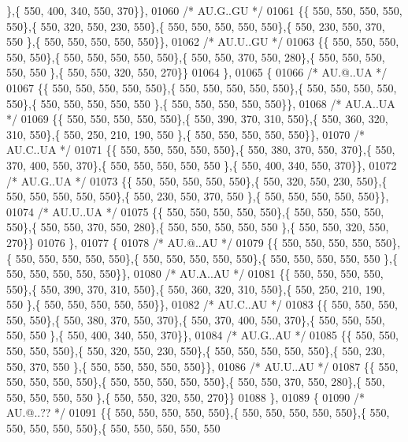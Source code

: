\begin{DoxyCode}
      \},\{ 550, 400, 340, 550, 370\}\},
01060 \textcolor{comment}{/* AU.G..GU */}
01061 \{\{ 550, 550, 550, 550, 550\},\{ 550, 320, 550, 230, 550\},\{ 550, 550, 550, 550, 550\},\{ 550, 230, 550, 370, 550
      \},\{ 550, 550, 550, 550, 550\}\},
01062 \textcolor{comment}{/* AU.U..GU */}
01063 \{\{ 550, 550, 550, 550, 550\},\{ 550, 550, 550, 550, 550\},\{ 550, 550, 370, 550, 280\},\{ 550, 550, 550, 550, 550
      \},\{ 550, 550, 320, 550, 270\}\}
01064 \},
01065 \{
01066 \textcolor{comment}{/* AU.@..UA */}
01067 \{\{ 550, 550, 550, 550, 550\},\{ 550, 550, 550, 550, 550\},\{ 550, 550, 550, 550, 550\},\{ 550, 550, 550, 550, 550
      \},\{ 550, 550, 550, 550, 550\}\},
01068 \textcolor{comment}{/* AU.A..UA */}
01069 \{\{ 550, 550, 550, 550, 550\},\{ 550, 390, 370, 310, 550\},\{ 550, 360, 320, 310, 550\},\{ 550, 250, 210, 190, 550
      \},\{ 550, 550, 550, 550, 550\}\},
01070 \textcolor{comment}{/* AU.C..UA */}
01071 \{\{ 550, 550, 550, 550, 550\},\{ 550, 380, 370, 550, 370\},\{ 550, 370, 400, 550, 370\},\{ 550, 550, 550, 550, 550
      \},\{ 550, 400, 340, 550, 370\}\},
01072 \textcolor{comment}{/* AU.G..UA */}
01073 \{\{ 550, 550, 550, 550, 550\},\{ 550, 320, 550, 230, 550\},\{ 550, 550, 550, 550, 550\},\{ 550, 230, 550, 370, 550
      \},\{ 550, 550, 550, 550, 550\}\},
01074 \textcolor{comment}{/* AU.U..UA */}
01075 \{\{ 550, 550, 550, 550, 550\},\{ 550, 550, 550, 550, 550\},\{ 550, 550, 370, 550, 280\},\{ 550, 550, 550, 550, 550
      \},\{ 550, 550, 320, 550, 270\}\}
01076 \},
01077 \{
01078 \textcolor{comment}{/* AU.@..AU */}
01079 \{\{ 550, 550, 550, 550, 550\},\{ 550, 550, 550, 550, 550\},\{ 550, 550, 550, 550, 550\},\{ 550, 550, 550, 550, 550
      \},\{ 550, 550, 550, 550, 550\}\},
01080 \textcolor{comment}{/* AU.A..AU */}
01081 \{\{ 550, 550, 550, 550, 550\},\{ 550, 390, 370, 310, 550\},\{ 550, 360, 320, 310, 550\},\{ 550, 250, 210, 190, 550
      \},\{ 550, 550, 550, 550, 550\}\},
01082 \textcolor{comment}{/* AU.C..AU */}
01083 \{\{ 550, 550, 550, 550, 550\},\{ 550, 380, 370, 550, 370\},\{ 550, 370, 400, 550, 370\},\{ 550, 550, 550, 550, 550
      \},\{ 550, 400, 340, 550, 370\}\},
01084 \textcolor{comment}{/* AU.G..AU */}
01085 \{\{ 550, 550, 550, 550, 550\},\{ 550, 320, 550, 230, 550\},\{ 550, 550, 550, 550, 550\},\{ 550, 230, 550, 370, 550
      \},\{ 550, 550, 550, 550, 550\}\},
01086 \textcolor{comment}{/* AU.U..AU */}
01087 \{\{ 550, 550, 550, 550, 550\},\{ 550, 550, 550, 550, 550\},\{ 550, 550, 370, 550, 280\},\{ 550, 550, 550, 550, 550
      \},\{ 550, 550, 320, 550, 270\}\}
01088 \},
01089 \{
01090 \textcolor{comment}{/* AU.@..?? */}
01091 \{\{ 550, 550, 550, 550, 550\},\{ 550, 550, 550, 550, 550\},\{ 550, 550, 550, 550, 550\},\{ 550, 550, 550, 550, 550

\end{DoxyCode}
